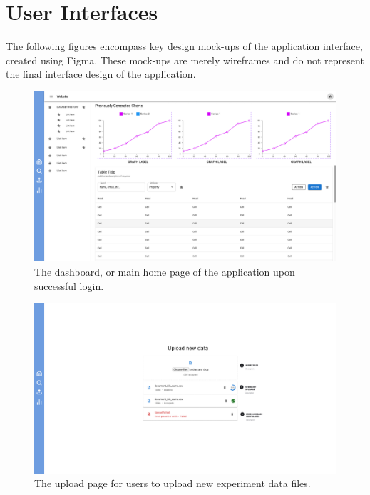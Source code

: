\documentclass[12pt, titlepage]{article}
\begin{document}
\section{User Interfaces}
The following figures encompass key design mock-ups of the application
interface, created using Figma. These mock-ups are merely wireframes and do not
represent the final interface design of the application.
\begin{figure}[htbp]
  \centering
  \includegraphics[width=\textwidth]{Figma/dashboard.pdf}
  \caption{The dashboard, or main home page of the application upon successful login.}
  \label{fig:FigUIDB}
\end{figure}

\begin{figure}[htbp]
  \centering
  \includegraphics[width=\textwidth]{Figma/upload.pdf}
  \caption{The upload page for users to upload new experiment data files.}
  \label{fig:FigUIUP}
\end{figure}
\end{document}
